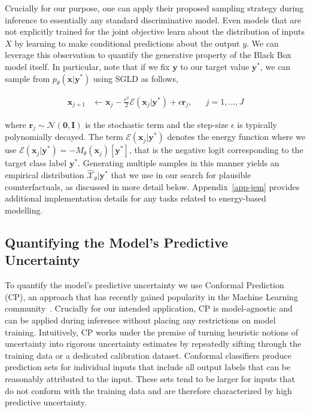 \documentclass{article}
\begin{document}
Crucially for our purpose, one can apply their proposed sampling strategy during inference to essentially any standard discriminative model. Even models that are not explicitly trained for the joint objective learn about the distribution of inputs $X$ by learning to make conditional predictions about the output $y$. We can leverage this observation to quantify the generative property of the Black Box model itself. In particular, note that if we fix $\mathbf{y}$ to our target value $\mathbf{y}^*$, we can sample from $p_{\theta}(\mathbf{x}|\mathbf{y}^*)$ using SGLD as follows, 

\begin{equation}\label{eq:sgld}
  \begin{aligned}
    \mathbf{x}_{j+1} &\leftarrow \mathbf{x}_j - \frac{\epsilon^2}{2} \mathcal{E}(\mathbf{x}_j|\mathbf{y}^*) + \epsilon \mathbf{r}_j, && j=1,...,J
  \end{aligned}
\end{equation}

where $\mathbf{r}_j \sim \mathcal{N}(\mathbf{0},\mathbf{I})$ is the stochastic term and the step-size $\epsilon$ is typically polynomially decayed. The term $\mathcal{E}(\mathbf{x}_j|\mathbf{y}^*)$ denotes the energy function where we use $\mathcal{E}(\mathbf{x}_j|\mathbf{y}^*)=-M_{\theta}(\mathbf{x}_j)[\mathbf{y}^*]$, that is the negative logit corresponding to the target class label $\mathbf{y}^*$. Generating multiple samples in this manner yields an empirical distribution $\hat{\mathcal{X}}_{\theta}|\mathbf{y}^*$ that we use in our search for plausible counterfactuals, as discussed in more detail below. Appendix~\ref{app-jem} provides additional implementation details for any tasks related to energy-based modelling. 

\subsection{Quantifying the Model's Predictive Uncertainty}

To quantify the model's predictive uncertainty we use Conformal Prediction (CP), an approach that has recently gained popularity in the Machine Learning community~\citep{angelopoulos2021gentle,manokhin2022awesome}. Crucially for our intended application, CP is model-agnostic and can be applied during inference without placing any restrictions on model training. Intuitively, CP works under the premise of turning heuristic notions of uncertainty into rigorous uncertainty estimates by repeatedly sifting through the training data or a dedicated calibration dataset. Conformal classifiers produce prediction sets for individual inputs that include all output labels that can be reasonably attributed to the input. These sets tend to be larger for inputs that do not conform with the training data and are therefore characterized by high predictive uncertainty. 
\end{document}
